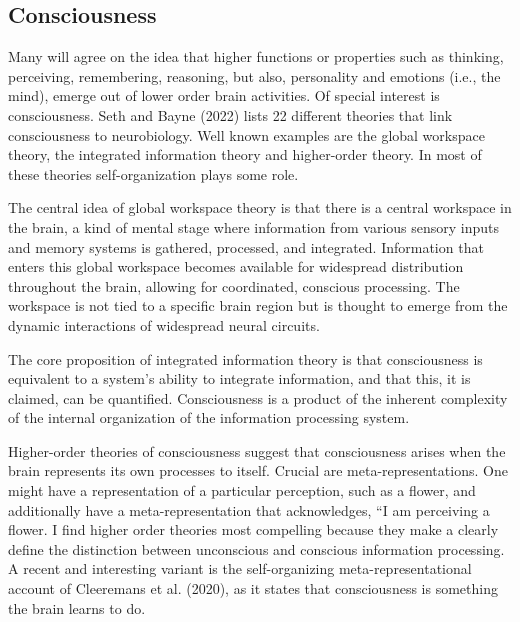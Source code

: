 \documentclass[
  a4paper,
  DIV=11,
  numbers=noendperiod]{scrreprt}
\begin{document}
\hypertarget{sec-Consciousness}{%
\subsection{Consciousness}\label{sec-Consciousness}}

Many will agree on the idea that higher functions or properties such as
thinking, perceiving, remembering, reasoning, but also, personality and
emotions (i.e., the mind), emerge out of lower order brain activities.
Of special interest is consciousness. Seth and Bayne (2022) lists 22
different theories that link consciousness to neurobiology. Well known
examples are the global workspace theory, the integrated information
theory and higher-order theory. In most of these theories
self-organization plays some role.

The central idea of global workspace theory is that there is a central
workspace in the brain, a kind of mental stage where information from
various sensory inputs and memory systems is gathered, processed, and
integrated. Information that enters this global workspace becomes
available for widespread distribution throughout the brain, allowing for
coordinated, conscious processing. The workspace is not tied to a
specific brain region but is thought to emerge from the dynamic
interactions of widespread neural circuits.

The core proposition of integrated information theory is that
consciousness is equivalent to a system's ability to integrate
information, and that this, it is claimed, can be quantified.
Consciousness is a product of the inherent complexity of the internal
organization of the information processing system.

Higher-order theories of consciousness suggest that consciousness arises
when the brain represents its own processes to itself. Crucial are
meta-representations. One might have a representation of a particular
perception, such as a flower, and additionally have a
meta-representation that acknowledges, ``I am perceiving a flower. I
find higher order theories most compelling because they make a clearly
define the distinction between unconscious and conscious information
processing. A recent and interesting variant is the self-organizing
meta-representational account of Cleeremans et al. (2020), as it states
that consciousness is something the brain learns to do.
\end{document}
